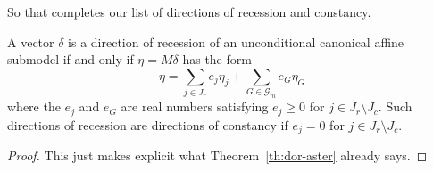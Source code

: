 So that completes our list of directions of recession and constancy.
\begin{theorem} \label{th:dor-aster-explicit}
A vector $\delta$ is a direction of recession
of an unconditional canonical affine submodel
if and only if $\eta = M \delta$ has the form
\begin{equation} \label{eq:dor-aster-explicit}
   \eta = \sum_{j \in J_r} e_j \eta_j + \sum_{G \in \mathcal{G}_m} e_G \eta_G
\end{equation}
where the $e_j$ and $e_G$ are real numbers satisfying $e_j \ge 0$ for
$j \in J_r \setminus J_c$.
Such directions of recession are directions of constancy if
$e_j = 0$ for $j \in J_r \setminus J_c$.
\end{theorem}
\begin{proof}
This just makes explicit what Theorem~\ref{th:dor-aster} already says.
\end{proof}

